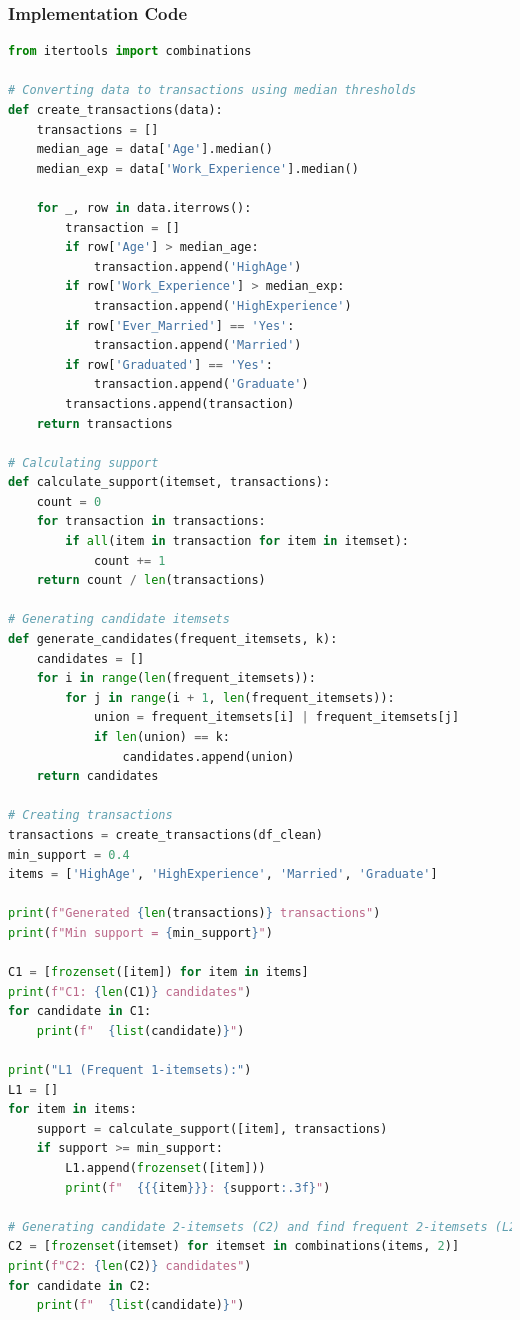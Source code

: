 \documentclass[12pt,a4paper]{article}
\begin{document}
\subsubsection{Implementation Code}
\begin{lstlisting}[language=Python, caption=Run Apriori on Market Basket Dataset]
from itertools import combinations

# Converting data to transactions using median thresholds
def create_transactions(data):
    transactions = []
    median_age = data['Age'].median()
    median_exp = data['Work_Experience'].median()
    
    for _, row in data.iterrows():
        transaction = []
        if row['Age'] > median_age:
            transaction.append('HighAge')
        if row['Work_Experience'] > median_exp:
            transaction.append('HighExperience')
        if row['Ever_Married'] == 'Yes':
            transaction.append('Married')
        if row['Graduated'] == 'Yes':
            transaction.append('Graduate')
        transactions.append(transaction)
    return transactions

# Calculating support
def calculate_support(itemset, transactions):
    count = 0
    for transaction in transactions:
        if all(item in transaction for item in itemset):
            count += 1
    return count / len(transactions)

# Generating candidate itemsets
def generate_candidates(frequent_itemsets, k):
    candidates = []
    for i in range(len(frequent_itemsets)):
        for j in range(i + 1, len(frequent_itemsets)):
            union = frequent_itemsets[i] | frequent_itemsets[j]
            if len(union) == k:
                candidates.append(union)
    return candidates

# Creating transactions
transactions = create_transactions(df_clean)
min_support = 0.4
items = ['HighAge', 'HighExperience', 'Married', 'Graduate']

print(f"Generated {len(transactions)} transactions")
print(f"Min support = {min_support}")

C1 = [frozenset([item]) for item in items]
print(f"C1: {len(C1)} candidates")
for candidate in C1:
    print(f"  {list(candidate)}")

print("L1 (Frequent 1-itemsets):")
L1 = []
for item in items:
    support = calculate_support([item], transactions)
    if support >= min_support:
        L1.append(frozenset([item]))
        print(f"  {{{item}}}: {support:.3f}")

# Generating candidate 2-itemsets (C2) and find frequent 2-itemsets (L2)
C2 = [frozenset(itemset) for itemset in combinations(items, 2)]
print(f"C2: {len(C2)} candidates")
for candidate in C2:
    print(f"  {list(candidate)}")


\end{lstlisting}
\end{document}
